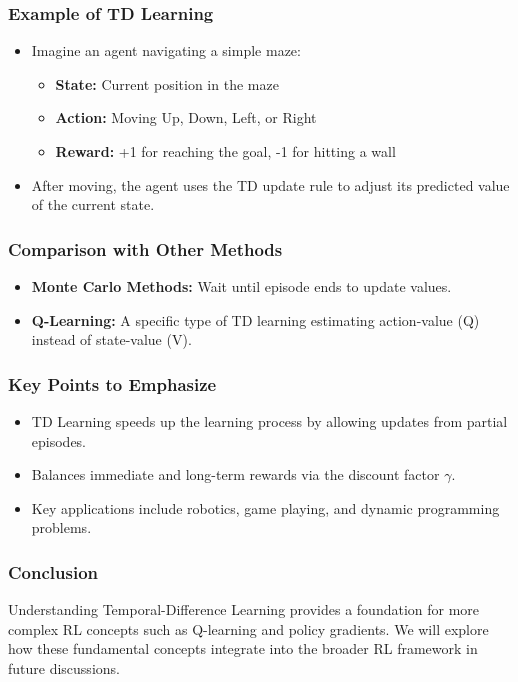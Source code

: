 \documentclass[aspectratio=169]{beamer}
\begin{document}
\begin{frame}[fragile]
    \frametitle{Example of TD Learning}
    \begin{itemize}
        \item Imagine an agent navigating a simple maze:
        \begin{itemize}
            \item \textbf{State:} Current position in the maze
            \item \textbf{Action:} Moving Up, Down, Left, or Right
            \item \textbf{Reward:} +1 for reaching the goal, -1 for hitting a wall
        \end{itemize}
        \item After moving, the agent uses the TD update rule to adjust its predicted value of the current state.
    \end{itemize}
\end{frame}

\begin{frame}[fragile]
    \frametitle{Comparison with Other Methods}
    \begin{itemize}
        \item \textbf{Monte Carlo Methods:} Wait until episode ends to update values.
        \item \textbf{Q-Learning:} A specific type of TD learning estimating action-value (Q) instead of state-value (V).
    \end{itemize}
\end{frame}

\begin{frame}[fragile]
    \frametitle{Key Points to Emphasize}
    \begin{itemize}
        \item TD Learning speeds up the learning process by allowing updates from partial episodes.
        \item Balances immediate and long-term rewards via the discount factor \( \gamma \).
        \item Key applications include robotics, game playing, and dynamic programming problems.
    \end{itemize}
\end{frame}

\begin{frame}[fragile]
    \frametitle{Conclusion}
    \begin{block}{}
        Understanding Temporal-Difference Learning provides a foundation for more complex RL concepts such as Q-learning and policy gradients. We will explore how these fundamental concepts integrate into the broader RL framework in future discussions.
    \end{block}
\end{frame}
\end{document}
